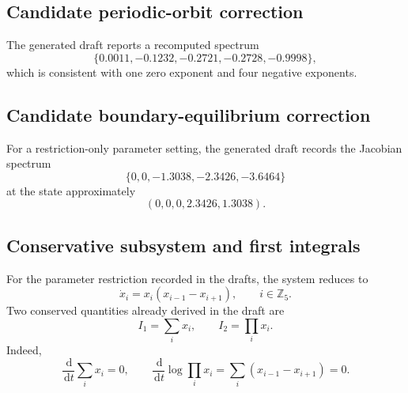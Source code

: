 \documentclass[11pt, reqno]{amsart}
\theoremstyle{definition}
\theoremstyle{remark}
\newcommand{\Z}{\mathbb{Z}}
\newcommand{\dd}{\,\mathrm{d}}
\begin{document}
\subsection{Candidate periodic-orbit correction}

The generated draft reports a recomputed spectrum
\begin{equation}
\label{eq:recomputed-cycle-spectrum}
    \{0.0011,-0.1232,-0.2721,-0.2728,-0.9998\},
\end{equation}
which is consistent with one zero exponent and four negative exponents.


\subsection{Candidate boundary-equilibrium correction}

For a restriction-only parameter setting, the generated draft records the
Jacobian spectrum
\begin{equation}
\label{eq:boundary-equilibrium-spectrum}
    \{0,0,-1.3038,-2.3426,-3.6464\}
\end{equation}
at the state approximately
\[
    (0,0,0,2.3426,1.3038).
\]


\subsection{Conservative subsystem and first integrals}

For the parameter restriction recorded in the drafts, the system reduces to
\begin{equation}
\label{eq:volterra-five}
    \dot x_i=x_i(x_{i-1}-x_{i+1}),
    \qquad i\in\Z_5.
\end{equation}
Two conserved quantities already derived in the draft are
\begin{equation}
\label{eq:first-integrals}
    I_1=\sum_i x_i,
    \qquad
    I_2=\prod_i x_i.
\end{equation}
Indeed,
\[
    \frac{\dd}{\dd t}\sum_i x_i=0,
    \qquad
    \frac{\dd}{\dd t}\log\prod_i x_i
    =
    \sum_i(x_{i-1}-x_{i+1})=0.
\]
\end{document}
